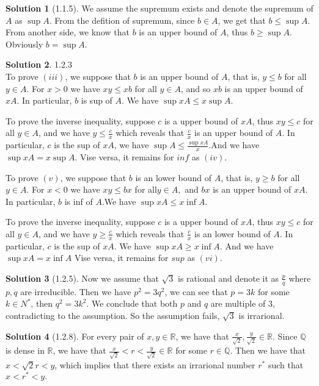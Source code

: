 \documentclass{article}
\theoremstyle{definition}
\newtheorem{sol}{Solution}[exe]
\begin{document}
\begin{sol}[1.1.5]
    We assume the supremum exists and denote the supremum of $A$ as $\sup A$. From the defition of supremum, since $b\in A$, we get that $b\leq \sup A$.
    From another side, we know that $b$ is an upper bound of $A$, thus $b\geq \sup A$. Obviously $b=\sup A.$
\end{sol}


\begin{sol} 1.2.3\\
    To prove $(iii)$, we suppose that $b$ is an upper bound of $A$, that is, $y\leq b$ for all $y\in A$. For $x>0$ we have 
    $xy\leq xb$ for all $y\in A$, and so $xb$ is an upper bound of $xA$. In particular, $b$ is sup of $A$.
    We have $\sup xA\leq x\sup A.$

    To prove the inverse inequality, suppose $c$ is a upper bound of $xA$, thus $xy\leq c$ for all 
    $y\in A$, and we have $y\leq \frac{c}{x}$ which reveals that $\frac{c}{x}$ is an upper bound of $A$. In particular, $c$ is the sup of $xA$, we have 
    $\sup A\leq \frac{\sup xA}{x}$.And we have $\sup xA=x\sup A$. Vise versa, it remains for $inf$ as $(iv)$.
    
    To prove $(v)$, we suppose that $b$ is an lower bound of $A$, that is, $y\geq b$ for all $y\in A$. For $x<0$ we have
    $xy\leq bx$ for all$ y\in A,$ and $bx$ is an upper bound of $xA$. In particular, $b$ is inf of $A$.We have $\sup xA\leq x\inf A.$
    
    To prove the inverse inequality, suppose $c$ is a upper bound of $xA$, thus $xy\leq c$ for all $y\in A$, and we have $y\geq \frac{c}{x}$ which reveals that $\frac{c}{x}$ is an lower bound of $A$. In particular, $c$ is the sup of $xA$.
    We have $\sup xA\geq x\inf A.$ And we have $\sup xA=x\inf A$ Vise versa, it remains for $sup$ as $(vi)$.
\end{sol}

\begin{sol}[1.2.5]
    Now we assume that $\sqrt{3}$ is rational and denote it as $\frac{p}{q}$ where $p,q$ are irreducible.
    Then we have $p^{2}=3q^{2}$, we can see that $p=3k$ for some $k\in N^{*}$, then $q^{2}=3k^{2}$. We conclude that 
    both $p$ and $q$ are multiple of 3, contradicting to the assumption. So the assumption fails, $\sqrt{3}$ is irrarional.
\end{sol}


\begin{sol}[1.2.8]
    For every pair of $x,y\in \mathbb{R}$, we have that $\frac{x}{\sqrt{2}},\frac{y}{\sqrt{2}}\in \mathbb{R}.$
    Since $\mathbb{Q}$ is dense in $\mathbb{R}$, we have that $\frac{x}{\sqrt{2}}<r<\frac{y}{\sqrt{2}}\in \mathbb{R}$ for some $r\in\mathbb{Q}$.
    Then we have that $x<\sqrt{2}r<y$, which implies that there exists an irrarional number $r^{*}$ such that $x<r^{*}<y.$
\end{sol}
\end{document}
